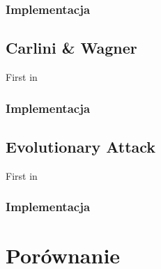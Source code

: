 \documentclass{article}
\begin{document}
\subsubsection{Implementacja}



\subsection{Carlini & Wagner}
First in \cite{DBLP:journals/corr/CarliniW16a}
\subsubsection{Implementacja}

\subsection{Evolutionary Attack}
First in \cite{DBLP:journals/corr/NguyenYC14}
\subsubsection{Implementacja}


\section{Porównanie}\label{comparison}







%
%
\end{document}
